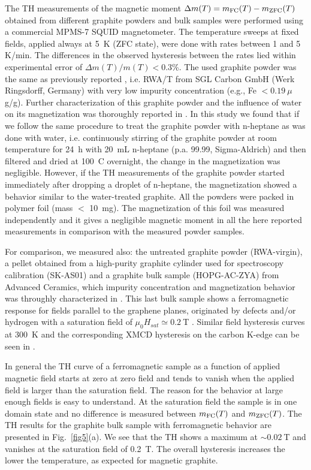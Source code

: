 \documentclass[aps,dvipsnames,twocolumn,floatfix,amsmath]{revtex4-1}
\begin{document}
The TH measurements of the magnetic moment $\Delta m(T) = m_{\rm
FC}(T) - m_{\rm ZFC}(T)$
 obtained from different graphite
powders and bulk samples were performed using a commercial MPMS-7
SQUID magnetometer. The temperature sweeps at fixed fields,
applied always at 5~K (ZFC state), were done with rates between 1
and 5 K/min. The differences in the observed hysteresis between
the rates lied within experimental error of $\Delta m(T) / m(T) <
0.3$\%. The used graphite powder was the same as previously
reported \cite{sch12}, i.e. RWA/T from SGL Carbon GmbH (Werk
Ringsdorff, Germany) with very low impurity concentration (e.g.,
Fe $<0.19~\mu$g/g). Further characterization of this graphite
powder and the influence of water on its magnetization was
thoroughly reported
 in \cite{sch12}.
In this study we found that if we follow the same procedure to
treat the graphite powder with n-heptane as was done with water,
i.e.  continuously stirring  of the graphite powder at room
temperature for 24~h   with 20~mL n-heptane
 (p.a. 99.99, Sigma-Aldrich) and
then filtered and dried at 100~C overnight, the change in the
magnetization was negligible. However, if the TH measurements of
the graphite powder started immediately after dropping a droplet
of n-heptane, the magnetization showed a behavior similar to the
water-treated graphite. All the powders were packed in polymer
foil (mass $<$ 10~mg). The magnetization of this foil was measured
independently and it gives a negligible magnetic moment in all the
here reported measurements in comparison with the measured powder
samples.

For comparison, we measured also: the untreated graphite powder
(RWA-virgin),  a pellet obtained from a high-purity graphite
cylinder used for spectroscopy  calibration (SK-AS01) and  a
graphite bulk sample (HOPG-AC-ZYA) from Advanced Ceramics, which
impurity concentration and magnetization behavior was throughly
characterized in \cite{spe14}. This last bulk sample shows a
ferromagnetic response
 for fields parallel to the graphene planes, originated by defects and/or hydrogen
with a saturation field of $\mu_0 H_{sat} \simeq 0.2~$T
\cite{spe14}. Similar field hysteresis curves at 300~K and the
corresponding XMCD hysteresis on the carbon K-edge can be seen in
\cite{ohldagnjp}.

In general the TH curve of a ferromagnetic sample as a function of
applied magnetic field starts at zero at zero field and tends to
vanish when the applied field is larger than the saturation field.
The reason for the behavior at large enough fields is easy to
understand. At the saturation field the sample is in one domain
state and no difference is measured between  $m_{\rm FC}(T)$ and
$m_{\rm ZFC}(T)$. The TH results for the graphite bulk sample with
ferromagnetic behavior are presented in Fig.~\ref{fig5}(a). We see
that the TH shows a maximum at $\sim 0.02~$T and vanishes at the
saturation field of 0.2~T. The overall hysteresis increases the
lower the temperature, as expected for magnetic graphite.
\end{document}
